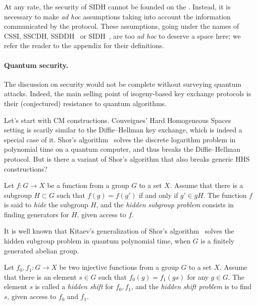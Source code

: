 \documentclass[b5layout]{hdr}
\begin{document}
At any rate, the security of SIDH cannot be founded on the
. %
Instead, it is necessary to make \emph{ad hoc} assumptions taking into
account the information communicated by the protocol. %
These assumptions, going under the names of CSSI, SSCDH,
SSDDH~\cite{jao+defeo2011,defeo+jao+plut12} or SIDH~\cite{SIKE}, are
too \emph{ad hoc} to deserve a space here; we refer the reader to the
appendix for their definitions.

\paragraph{Quantum security.}
The discussion on security would not be complete without surveying
quantum attacks. %
Indeed, the main selling point of isogeny-based key exchange protocols
is their (conjectured) resistance to quantum algorithms. %

Let's start with CM constructions. %
Couveignes' Hard Homogeneous Spaces setting is scarily similar to the
Diffie--Hellman key exchange, which is indeed a special case of it. %
Shor's algorithm~\cite{shor1994algorithms} solves the discrete
logarithm problem in polynomial time on a quantum computer, and thus
breaks the Diffie--Hellman protocol. %
But is there a variant of Shor's algorithm that also breaks generic
HHS constructions? %

\begin{definition}
  Let $f:G→X$ be a function from a group $G$ to a set $X$. %
  Assume that there is a subgroup $H⊂G$ such that $f(g)=f(g')$ if and
  only if $g'∈gH$. %
  The function $f$ is said to \emph{hide} the subgroup $H$, and the
  \emph{hidden subgroup problem} consists in finding generators for
  $H$, given access to $f$.
\end{definition}

It is well known that Kitaev's generalization of Shor's
algorithm~\cite{kitaev1995hsp} solves the hidden subgroup problem in
quantum polynomial time, when $G$ is a finitely generated abelian
group. %

\begin{definition}
  Let $f_0,f_1:G→X$ be two injective functions from a group $G$ to a
  set $X$. %
  Assume that there is an element $s∈G$ such that $f_0(g)=f_1(gs)$ for
  any $g∈G$. %
  The element $s$ is called a \emph{hidden shift} for $f_0,f_1$, and
  the \emph{hidden shift problem} is to find $s$, given access to
  $f_0$ and $f_1$. %
\end{definition}
\end{document}
